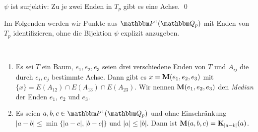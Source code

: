 \documentclass[a4paper, 12pt, twoside]{article}
\begin{document}
$\psi$ ist surjektiv: Zu je zwei Enden in $T_p$ gibt es eine Achse.
\qed

Im Folgenden werden wir Punkte aus $\PP^1(\QQ_p)$ mit
Enden von $T_p$ identifizieren, ohne die Bijektion 
$\psi$ explizit anzugeben.

\DB\ \label{bem_median}
\begin{enumerate}
\item Es sei $T$ ein Baum, $e_1,e_2,e_3$ seien drei verschiedene
Enden von $T$ und $A_{ij}$ die durch $e_i,e_j$ bestimmte Achse.
Dann gibt es $x=\mathbf{M}(e_1,e_2,e_3)$ mit
$\{x\}=E(A_{12})\cap E(A_{13})\cap E(A_{23})$.
Wir nennen $\mathbf{M}(e_1,e_2,e_3)$ den \emph{Median}
der Enden $e_1$, $e_2$ und $e_3$.
\item Es seien $a,b,c\in\PP^1(\QQ_p)$ und ohne Einschränkung
$|a-b|\leq\min\{|a-c|,|b-c|\}$ und $|a|\leq |b|$.
Dann ist $\mathbf{M}(a,b,c)=\mathbf{K}_{|a-b|}(a)$.
\end{enumerate}
\end{document}
